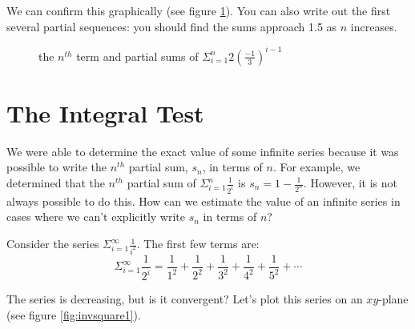 We can confirm this graphically (see figure \ref{fig:geometric}). You 
can also write out the first several partial sequences: you should 
find the sums approach 1.5 as $n$ increases.

\begin{figure}[htbp]
\centering
    \caption{the $n^{th}$ term and partial sums of $\Sigma_{i=1}^n 
    2(\frac{-1}{3})^{i-1}$}
    \label{fig:geometric}
\end{figure}

\section{The Integral Test}
We were able to determine the exact value of some infinite series because it 
was possible to write the $n^{th}$ partial sum, $s_n$, in terms of $n$. For 
example, we determined that the $n^{th}$ partial sum of $\Sigma_{i = 1}^n 
\frac{1}{2^i}$ is $s_n = 1 - \frac{1}{2^n}$. However, it is not always possible 
to do this. How can we estimate the value of an infinite series in cases where 
we can't explicitly write $s_n$ in terms of $n$?

Consider the series $\Sigma_{i = 1}^\infty \frac{1}{i^2}$. The first few terms 
are:
$$\Sigma_{i = 1}^\infty \frac{1}{2^i} = \frac{1}{1^2} + \frac{1}{2^2} + 
\frac{1}{3^2} + \frac{1}{4^2} + \frac{1}{5^2} + \cdots$$

The series is decreasing, but is it convergent? Let's plot this series on an 
$xy$-plane (see figure \ref{fig:invsquare1}). 


